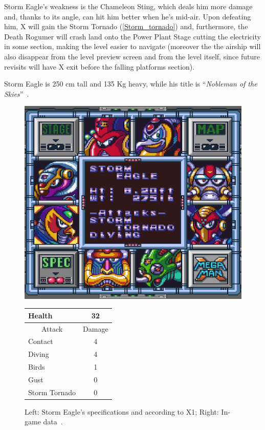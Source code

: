 Storm Eagle's weakness is the Chameleon Sting, which deals him more damage and, thanks to its angle, can hit him better when he's mid-air. Upon defeating him, X will gain the Storm Tornado (\ref{Storm_tornado}) and, furthermore, the Death Rogumer will crash land onto the Power Plant Stage cutting the electricity in some section, making the level easier to navigate (moreover the the airship will also disappear from the level preview screen and from the level itself, since future revisits will have X exit before the falling platforms section).

Storm Eagle is 250 cm tall and 135 Kg heavy, while his title is ``\textit{Nobleman of the Skies}''~\cite{book:MMX_Complete_art}.

\begin{figure}[htp]
	\begin{minipage}[c]{0.45\linewidth}
		\vspace{0pt}
		\centering
		\includegraphics[width=\linewidth]{figures/X1/Storm_eagle/Storm_eagle_specs.png}
	\end{minipage}
	\begin{minipage}[c]{0.45\linewidth}
		\centering
		\vspace{0pt}
		\begin{tabular}[h]{l c}
			\toprule
			Health  & 32\\
			\midrule
			\multicolumn{1}{c}{Attack} & \multicolumn{1}{c}{Damage}\\
			Contact & 4\\
			Diving & 4\\
			Birds & 1\\
			Gust & 0\\
			Storm Tornado & 0\\
			\bottomrule
		\end{tabular}
	\end{minipage}
	\caption{Left: Storm Eagle's specifications and according to X1; Right: In-game data~\cite{wiki:Storm_eagle}. }
	\label{Eagle_specs}
\end{figure}

